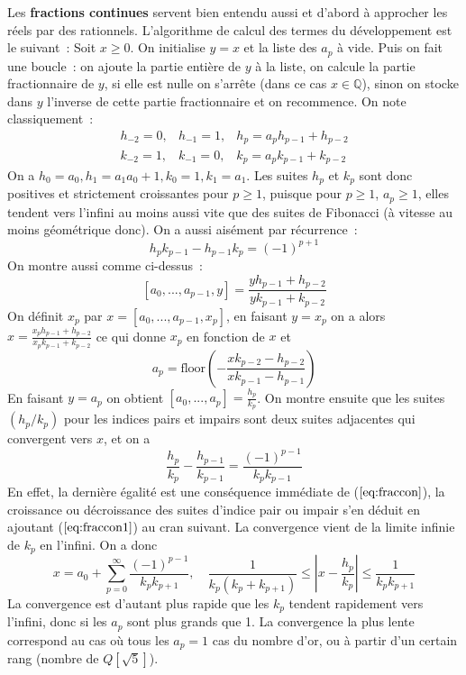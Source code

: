 \documentclass[a4paper,11pt]{book}
\begin{document}
\begin{giacjshere}
Les {\bf fractions continues} 
 servent bien entendu aussi et d'abord \`a approcher les
r\'eels par des rationnels.
L'algorithme de calcul des termes du d\'eveloppement est le suivant~:
Soit $x\geq0$. On initialise $y=x$ et la liste des $a_p$ \`a vide. 
Puis on fait une boucle~: on ajoute la partie enti\`ere de $y$ \`a la
liste, on calcule la partie fractionnaire de $y$, si elle est nulle on
s'arr\^ete (dans ce cas $x\in \mathbb{Q}$),
sinon on stocke dans $y$ l'inverse de cette partie fractionnaire et on recommence.
On note classiquement~:
\begin{eqnarray} h_{-2}=0, & h_{-1}=1, & h_p=a_p h_{p-1}+h_{p-2}\\
k_{-2}=1, & k_{-1}=0, & k_p=a_p k_{p-1}+k_{p-2}
\end{eqnarray}
On a $h_0=a_0, h_1=a_1 a_0+1, k_0=1, k_1=a_1$.
Les suites $h_p$ et $k_p$ sont donc positives et strictement croissantes pour $p
\geq 1$, puisque pour $p \geq 1$, $a_p\geq 1$, elles tendent vers
l'infini au moins aussi vite que des suites de Fibonacci (\`a vitesse
au moins g\'eom\'etrique donc).
On a aussi ais\'ement par r\'ecurrence~:
\begin{equation} \label{eq:fraccon}
 h_p k_{p-1} - h_{p-1}k_p=(-1)^{p+1}
\end{equation}
On montre aussi comme ci-dessus~:
$$ [a_0,...,a_{p-1},y]=\frac{yh_{p-1}+h_{p-2}}{yk_{p-1}+k_{p-2}}$$
On d\'efinit $x_p$ par $x=[a_0,...,a_{p-1},x_p]$, en faisant $y=x_p$
on a alors $x=\frac{x_ph_{p-1}+h_{p-2}}{x_p k_{p-1}+k_{p-2}}$ ce qui
donne $x_p$ en fonction de $x$ et
$$ a_p=\mbox{floor}\left( - \frac{xk_{p-2}-h_{p-2}}{xk_{p-1}-h_{p-1}} \right)$$
En faisant $y=a_p$ on obtient $[a_0,...,a_p]=\frac{h_p}{k_p}$.
On montre ensuite que les suites $(h_p/k_p)$ pour les indices pairs et impairs sont deux
suites adjacentes qui convergent vers $x$, et on a
\begin{equation} \label{eq:fraccon1}
\frac{h_p}{k_p} - \frac{h_{p-1}}{k_{p-1}} = \frac{(-1)^{p-1}}{k_p
  k_{p-1}}
\end{equation}
En effet, la derni\`ere \'egalit\'e est une cons\'equence imm\'ediate
de (\(\ref{eq:fraccon}\)), la croissance ou d\'ecroissance des suites
d'indice pair ou impair s'en d\'eduit en ajoutant (\(\ref{eq:fraccon1}\)) au cran
suivant. La convergence vient de la
limite infinie de $k_p$ en l'infini.
On a donc
$$ x=a_0+\sum_{p=0}^\infty \frac{(-1)^{p-1}}{k_p k_{p+1}}, 
\quad \frac{1}{k_p(k_p+k_{p+1})} \leq |x-\frac{h_p}{k_p}| \leq \frac{1}{k_p
  k_{p+1}}$$
La convergence est d'autant plus rapide que les $k_p$ tendent
rapidement vers l'infini, donc si les $a_p$ sont plus grands que 1.
La convergence la plus lente correspond au cas o\`u tous les $a_p=1$
cas du nombre d'or, ou \`a partir d'un certain rang (nombre de $Q[\sqrt{5}]$).


\end{giacjshere}
\end{document}
